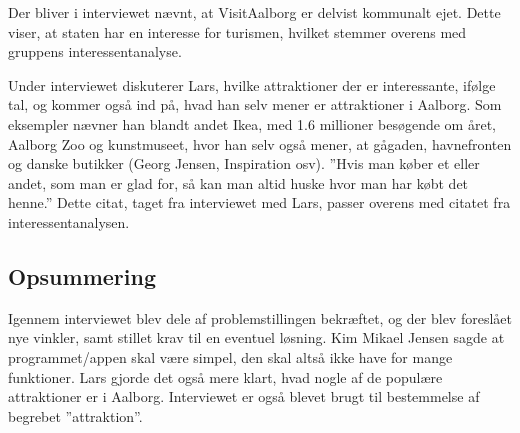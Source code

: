 Der bliver i interviewet nævnt, at VisitAalborg er delvist kommunalt ejet. Dette viser, at staten har en interesse for turismen, hvilket stemmer overens med gruppens interessentanalyse.

Under interviewet diskuterer Lars, hvilke attraktioner der er interessante, ifølge tal, og kommer også ind på, hvad han selv mener er attraktioner i Aalborg. Som eksempler nævner han blandt andet Ikea, med 1.6 millioner besøgende om året, Aalborg Zoo og kunstmuseet, hvor han selv også mener, at gågaden, havnefronten og danske butikker (Georg Jensen, Inspiration osv). ”Hvis man køber et eller andet, som man er glad for, så kan man altid huske hvor man har købt det henne.” Dette citat, taget fra interviewet med Lars, passer overens med citatet fra interessentanalysen.
\subsection{Opsummering}
Igennem interviewet blev dele af problemstillingen bekræftet, og der blev foreslået nye vinkler, samt stillet krav til en eventuel løsning. Kim Mikael Jensen sagde at programmet/appen skal være simpel, den skal altså ikke have for mange funktioner. Lars gjorde det også mere klart, hvad nogle af de populære attraktioner er i Aalborg. Interviewet er også blevet brugt til bestemmelse af begrebet ”attraktion”. 